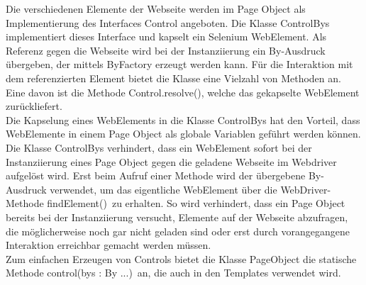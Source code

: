 Die verschiedenen Elemente der Webseite werden im Page Object als Implementierung des Interfaces Control angeboten.
Die Klasse ControlBys implementiert dieses Interface und kapselt ein Selenium WebElement. Als Referenz gegen die Webseite wird bei der Instanziierung ein By-Ausdruck übergeben, der mittels ByFactory erzeugt werden kann.
Für die Interaktion mit dem referenzierten Element bietet die Klasse eine Vielzahl von Methoden an. Eine davon ist die Methode \grq Control.resolve()\grq, welche das gekapselte WebElement zurückliefert.\\
Die Kapselung eines WebElements in die Klasse ControlBys hat den Vorteil, dass WebElemente in einem Page Object als globale Variablen geführt werden können.
Die Klasse ControlBys verhindert, dass ein WebElement sofort bei der Instanziierung eines Page Object gegen die geladene Webseite im Webdriver aufgelöst wird. Erst beim Aufruf einer Methode wird der übergebene By-Ausdruck verwendet, um das eigentliche WebElement über die WebDriver-Methode \grq findElement()\grq\ zu erhalten.
So wird verhindert, dass ein Page Object bereits bei der Instanziierung versucht, Elemente auf der Webseite abzufragen, die möglicherweise noch gar nicht geladen sind oder erst durch vorangegangene Interaktion erreichbar gemacht werden müssen.\\ Zum einfachen Erzeugen von Controls bietet die Klasse PageObject die statische Methode \grq control(bys : By ...)\grq\ an, die auch in den Templates verwendet wird.


